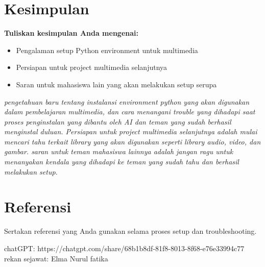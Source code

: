 \documentclass[11pt,a4paper]{article}
\begin{document}
\section{Kesimpulan}
\textbf{Tuliskan kesimpulan Anda mengenai:}
\begin{itemize}
    \item Pengalaman setup Python environment untuk multimedia
    \item Persiapan untuk project multimedia selanjutnya
    \item Saran untuk mahasiswa lain yang akan melakukan setup serupa
\end{itemize}

\textit{pengetahuan baru tentang instalansi environment python yang akan digunakan dalam pembelajaran multimedia, dan cara menangani trouble yang dihadapi saat proses penginstalan yang dibantu oleh AI dan teman yang sudah berhasil menginstal duluan. Persiapan untuk project multimedia selanjutnya adalah mulai mencari tahu terkait library yang akan digunakan seperti library audio, video, dan gambar. saran untuk teman mahasiswa lainnya adalah jangan ragu untuk menanyakan kendala yang dihadapi ke teman yang sudah tahu dan berhasil melakukan setup.}

\section{Referensi}
Sertakan referensi yang Anda gunakan selama proses setup dan troubleshooting.

\newpage


chatGPT: https://chatgpt.com/share/68b1b8df-81f8-8013-8f68-e76e33994c77
rekan sejawat: Elma Nurul fatika
\end{document}
